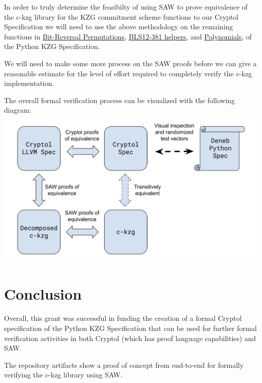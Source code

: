 \documentclass[12pt]{galois-whitepaper}
\begin{document}
In order to truly determine the feasibilty of using SAW to prove equivalence of the c-kzg library for the KZG commitment
scheme functions to our Cryptol Specification we will need to use the above methodology on the remaining functions in
\href{https://github.com/ethereum/consensus-specs/blob/68d32accf945a84f69d4c779cb6c71223a311eac/specs/deneb/polynomial-commitments.md\#bit-reversal-permutation}{Bit-Reversal Permutations},
\href{https://github.com/ethereum/consensus-specs/blob/68d32accf945a84f69d4c779cb6c71223a311eac/specs/deneb/polynomial-commitments.md\#bls12-381-helpers}{BLS12-381 helpers},
and \href{https://github.com/ethereum/consensus-specs/blob/68d32accf945a84f69d4c779cb6c71223a311eac/specs/deneb/polynomial-commitments.md#polynomials}{Polynomials},
of the Python KZG Specification.

We will need to make some more process on the SAW proofs before we can give a reasonable estimate
for the level of effort required to completely verify the c-kzg implementation.

The overall formal verification process can be visualized with the following diagram:
\includegraphics[width=\textwidth]{Proof-Equivalence-Diagram.png}

\section{Conclusion}

Overall, this grant was successful in funding the creation of a formal Cryptol specification of
the Python KZG Specification that can be used for further formal verification activities in both
Cryptol (which has proof language capabilities) and SAW.

The repository artifacts show a proof of concept from end-to-end for formally verifying the c-kzg
library using SAW.
\end{document}
